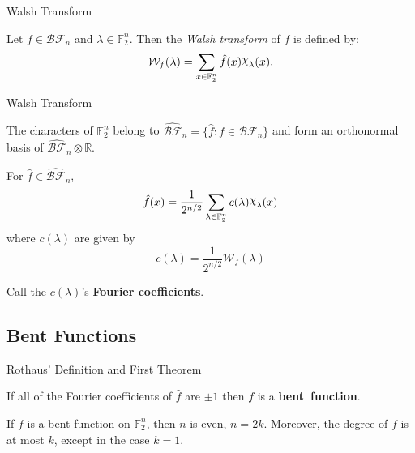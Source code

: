 \documentclass{beamer}
\def\gftwo{\mathbb{F}_2}
\def\BF{\mathcal{BF}}
\def\Chi{\raisebox{2pt}{$\chi$}}
\begin{document}
\begin{frame}{Walsh Transform}
  \begin{definition}\label{def:walsh}
    Let $f\in\BF_n$ and $\lambda\in\gftwo^n$. Then the {\em Walsh transform}
    of $f$ is defined by:
    \begin{equation}\label{eqn:walsh}
      \mathcal{W}_f(\lambda)=\sum_{x\in\gftwo^n}\hat{f}(x)\Chi_\lambda(x).
    \end{equation}
  \end{definition}
\end{frame}

\begin{frame}{Walsh Transform}
  \begin{lemma}
    The characters of $\gftwo^n$ belong to $\hat{\BF}_n
    =\{\hat{f}:f\in\BF_n\}$ and form an orthonormal basis of
    $\hat{\BF}_n\otimes\mathbb{R}$.
  \end{lemma}
  \begin{lemma}
    For $\hat{f}\in\hat{\BF}_n$,
  \begin{equation}\label{eqn:rewrite-pseudo}
  	\hat{f}(x)
      =\frac{1}{2^{n/2}}
        \sum_{\lambda\in\gftwo^n}c(\lambda)\Chi_\lambda(x)
  \end{equation}
  	where $c(\lambda)$ are given by
    \begin{equation}\label{eqn:clambda}
      c(\lambda)=\frac{1}{2^{n/2}}\mathcal{W}_f(\lambda)
    \end{equation}
  \end{lemma}
  Call the $c(\lambda)$'s {\bf Fourier coefficients}.
\end{frame}

\subsection{Bent Functions}
\begin{frame}{Rothaus' Definition and First Theorem}
  \begin{definition}\label{def:bent-function}
    If all of the Fourier coefficients of $\hat{f}$ are $\pm1$ then
    $f$ is a {\bf bent\ function}.
  \end{definition}
  \begin{theorem}\label{thm:deg-of-bent-function}
  	If $f$ is a bent function on $\gftwo^n$, then $n$ is even, $n=2k$.
    Moreover, the degree of $f$ is at most $k$, except in the case $k=1$.
  \end{theorem}
\end{frame}
\end{document}
